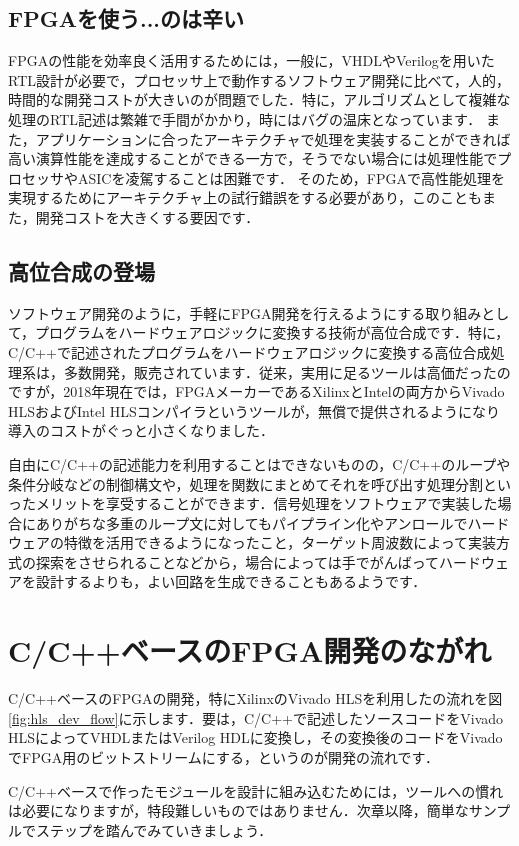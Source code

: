 \documentclass[a4paper,dvipdfmx]{jsarticle}
\begin{document}
\subsection{FPGAを使う...のは辛い}

FPGAの性能を効率良く活用するためには，一般に，VHDLやVerilogを用いたRTL設計が必要で，プロセッサ上で動作するソフトウェア開発に比べて，人的，時間的な開発コストが大きいのが問題でした．特に，アルゴリズムとして複雑な処理のRTL記述は繁雑で手間がかかり，時にはバグの温床となっています．
また，アプリケーションに合ったアーキテクチャで処理を実装することができれば高い演算性能を達成することができる一方で，そうでない場合には処理性能でプロセッサやASICを凌駕することは困難です．
そのため，FPGAで高性能処理を実現するためにアーキテクチャ上の試行錯誤をする必要があり，このこともまた，開発コストを大きくする要因です．

\subsection{高位合成の登場}

ソフトウェア開発のように，手軽にFPGA開発を行えるようにする取り組みとして，プログラムをハードウェアロジックに変換する技術が高位合成です．特に，C/C++で記述されたプログラムをハードウェアロジックに変換する高位合成処理系は，多数開発，販売されています．従来，実用に足るツールは高価だったのですが，2018年現在では，FPGAメーカーであるXilinxとIntelの両方からVivado HLSおよびIntel HLSコンパイラというツールが，無償で提供されるようになり導入のコストがぐっと小さくなりました．

自由にC/C++の記述能力を利用することはできないものの，C/C++のループや条件分岐などの制御構文や，処理を関数にまとめてそれを呼び出す処理分割といったメリットを享受することができます．信号処理をソフトウェアで実装した場合にありがちな多重のループ文に対してもパイプライン化やアンロールでハードウェアの特徴を活用できるようになったこと，ターゲット周波数によって実装方式の探索をさせられることなどから，場合によっては手でがんばってハードウェアを設計するよりも，よい回路を生成できることもあるようです．

\section{C/C++ベースのFPGA開発のながれ}
C/C++ベースのFPGAの開発，特にXilinxのVivado HLSを利用したの流れを図\ref{fig:hls_dev_flow}に示します．要は，C/C++で記述したソースコードをVivado HLSによってVHDLまたはVerilog HDLに変換し，その変換後のコードをVivadoでFPGA用のビットストリームにする，というのが開発の流れです．

C/C++ベースで作ったモジュールを設計に組み込むためには，ツールへの慣れは必要になりますが，特段難しいものではありません．次章以降，簡単なサンプルでステップを踏んでみていきましょう．
\end{document}
